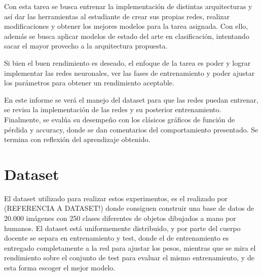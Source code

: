     Con esta tarea se busca entrenar la implementación de distintas arquitecturas y así dar las herramientas al estudiante de crear sus propias redes, realizar modificaciones y obtener los mejores modelos para la tarea asignada. Con ello, además se busca aplicar modelos de estado del arte en clasificación, intentando sacar el mayor provecho a la arquitectura propuesta.
    
    Si bien el buen rendimiento es deseado, el enfoque de la tarea es poder y lograr implementar las redes neuronales, ver las fases de entrenamiento y poder ajustar los parámetros para obtener un rendimiento aceptable.
    
    En este informe se verá el manejo del dataset para que las redes puedan entrenar, se revisa la implementación de las redes y su posterior entrenamiento. Finalmente, se evalúa su desempeño con los clásicos gráficos de función de pérdida y accuracy, donde se dan comentarios del comportamiento presentado. Se termina con reflexión del aprendizaje obtenido.


\section{Dataset}

    El dataset utilizado para realizar estos experimentos, es el realizado por (REFERENCIA A DATASET!) donde consiguen construir una base de datos de 20.000 imágenes con 250 clases diferentes de objetos dibujados a mano por humanos. El dataset está uniformemente distribuido, y por parte del cuerpo docente se separa en entrenamiento y test, donde el de entrenamiento es entregado completamente a la red para ajustar los pesos, mientras que se mira el rendimiento sobre el conjunto de test para evaluar el mismo entrenamiento, y de esta forma escoger el mejor modelo.
    
